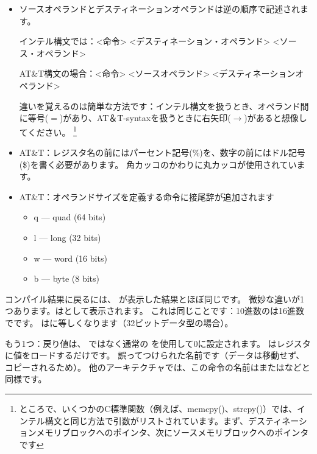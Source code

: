 \begin{itemize}

\item
ソースオペランドとデスティネーションオペランドは逆の順序で記述されます。

インテル構文では：<命令> <デスティネーション・オペランド> <ソース・オペランド>

AT\&T構文の場合：<命令> <ソースオペランド> <デスティネーションオペランド>

違いを覚えるのは簡単な方法です：インテル構文を扱うとき、オペランド間に等号($=$)があり、AT＆T-syntaxを扱うときに右矢印($\rightarrow$)があると想像してください。
\footnote{ところで、いくつかのC標準関数（例えば、memcpy()、strcpy()）では、インテル構文と同じ方法で引数がリストされています。まず、デスティネーションメモリブロックへのポインタ、次にソースメモリブロックへのポインタです}

\item
AT\&T：レジスタ名の前にはパーセント記号(\%)を、数字の前にはドル記号(\$)を書く必要があります。 角カッコのかわりに丸カッコが使用されています。

\item
AT\&T：オペランドサイズを定義する命令に接尾辞が追加されます

\begin{itemize}
\item q --- quad (64 bits)
\item l --- long (32 bits)
\item w --- word (16 bits)
\item b --- byte (8 bits)
\end{itemize}


\end{itemize}

コンパイル結果に戻るには、 \IDA が表示した結果とほぼ同じです。 微妙な違いが1つあります。はとして表示されます。 これは同じことです：10進数のは16進数でです。 はに等しくなります（32ビットデータ型の場合）。

もう1つ：戻り値は、 \XOR ではなく通常の \MOV を使用して0に設定されます。 \MOV はレジスタに値をロードするだけです。 
誤ってつけられた名前です（データは移動せず、コピーされるため）。 他のアーキテクチャでは、この命令の名前はまたはなどと同様です。

